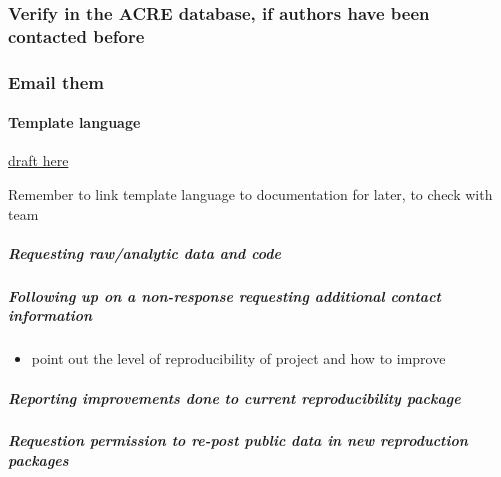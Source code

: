 \documentclass[]{book}
\providecommand{\tightlist}{%
  \setlength{\itemsep}{0pt}\setlength{\parskip}{0pt}}
\let\oldparagraph\paragraph
\renewcommand{\paragraph}[1]{\oldparagraph{#1}\mbox{}}
\let\oldsubparagraph\subparagraph
\renewcommand{\subparagraph}[1]{\oldsubparagraph{#1}\mbox{}}
\begin{document}
\hypertarget{verify-in-the-acre-database-if-authors-have-been-contacted-before}{%
\subsubsection{Verify in the ACRE database, if authors have been contacted before}\label{verify-in-the-acre-database-if-authors-have-been-contacted-before}}

\hypertarget{email-them}{%
\subsubsection{Email them}\label{email-them}}

\hypertarget{template-language}{%
\paragraph{Template language}\label{template-language}}

\href{https://docs.google.com/document/d/1xJ7pZTQ1VQXVCrs6IUlp7HlBB4oxYha0oOniCG2SWLM/edit?ts=5d251563}{draft here}

Remember to link template language to documentation for later, to check with team

\hypertarget{requesting-rawanalytic-data-and-code}{%
\subparagraph{Requesting raw/analytic data and code}\label{requesting-rawanalytic-data-and-code}}

\hypertarget{following-up-on-a-non-response-requesting-additional-contact-information}{%
\subparagraph{Following up on a non-response requesting additional contact information}\label{following-up-on-a-non-response-requesting-additional-contact-information}}

\begin{itemize}
\tightlist
\item
  point out the level of reproducibility of project and how to improve
\end{itemize}

\hypertarget{reporting-improvements-done-to-current-reproducibility-package}{%
\subparagraph{Reporting improvements done to current reproducibility package}\label{reporting-improvements-done-to-current-reproducibility-package}}

\hypertarget{requestion-permission-to-re-post-public-data-in-new-reproduction-packages}{%
\subparagraph{Requestion permission to re-post public data in new reproduction packages}\label{requestion-permission-to-re-post-public-data-in-new-reproduction-packages}}
\end{document}
